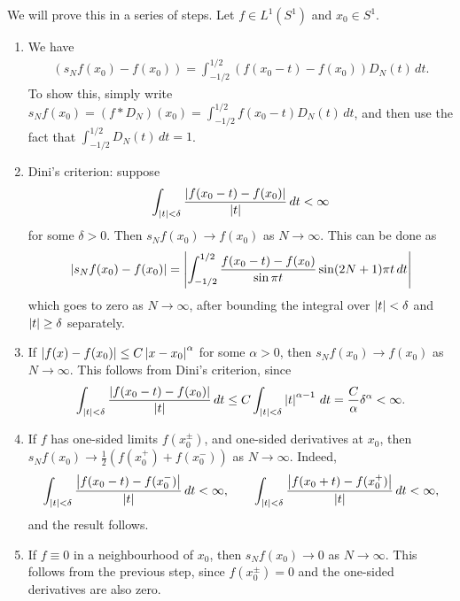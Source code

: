 We will prove this in a series of steps. Let $f \in L^{1}(S^{1})$ and $x_{0} \in S^{1}$.
\begin{enumerate}
    \item We have
    \begin{align}
        (s_{N}f(x_{0}) - f(x_{0})) = \int_{-1/2}^{1/2} (f(x_{0}-t)-f(x_{0}))D_{N}(t) \, dt.
    \end{align}
    To show this, simply write $s_{N}f(x_{0}) = (f\ast D_{N})(x_{0}) = \int_{-1/2}^{1/2} f(x_{0}-t)D_{N}(t) \, dt$, and then use the fact that $\int_{-1/2}^{1/2} D_{N}(t) \, dt = 1$.
    \item Dini's criterion: suppose
    \begin{align}
        \int_{\left| t \right| < \delta} \frac{\left| f(x_{0}-t)-f(x_{0}) \right|}{\left| t \right|} \, dt < \infty
    \end{align}
    for some $\delta > 0$. Then $s_{N}f(x_{0}) \to f(x_{0})$ as $N \to \infty$. This can be done as
    \begin{align}
        \left| s_{N}f(x_{0}) - f(x_{0}) \right| = \left| \int_{-1/2}^{1/2} \frac{f(x_{0}-t)-f(x_{0})}{\sin \pi t} \sin(2N+1)\pi t \, dt \right|
    \end{align}
    which goes to zero as $N \to \infty$, after bounding the integral over $\left| t \right| < \delta$ and $\left| t \right| \geq \delta$ separately.

    \item If $\left| f(x)-f(x_{0}) \right| \leq C\left| x-x_{0} \right|^{\alpha}$ for some $\alpha > 0$, then $s_{N}f(x_{0}) \to f(x_{0})$ as $N \to \infty$. This follows from Dini's criterion, since
    \begin{align}
        \int_{\left| t \right| < \delta} \frac{\left| f(x_{0}-t)-f(x_{0}) \right|}{\left| t \right|} \, dt \leq C\int_{\left| t \right| < \delta} \left| t \right|^{\alpha-1} \, dt = \frac{C}{\alpha}\delta^{\alpha} < \infty.
    \end{align}

    \item If $f$ has one-sided limits $f(x_{0}^{\pm})$, and one-sided derivatives at $x_{0}$, then $s_{N}f(x_{0}) \to \frac{1}{2}(f(x_{0}^{+})+f(x_{0}^{-}))$ as $N \to \infty$. Indeed,
    \begin{align}
        \int_{\left| t \right| < \delta} \frac{\left| f(x_{0}-t)-f(x_{0}^{-}) \right|}{\left| t \right|} \, dt < \infty, \qquad \int_{\left| t \right| < \delta} \frac{\left| f(x_{0}+t)-f(x_{0}^{+}) \right|}{\left| t \right|} \, dt < \infty,
    \end{align}
    and the result follows.

    \item If $f \equiv 0$ in a neighbourhood of $x_{0}$, then $s_{N}f(x_{0}) \to 0$ as $N \to \infty$. This follows from the previous step, since $f(x_{0}^{\pm}) = 0$ and the one-sided derivatives are also zero.
    

\end{enumerate}
